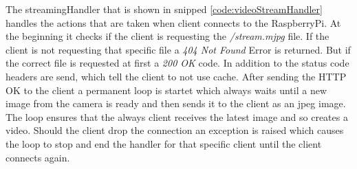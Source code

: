 

The streamingHandler that is shown in snipped \ref{code:videoStreamHandler} handles the actions that are taken when client connects to the RaspberryPi. At the beginning it checks if the client is requesting the \textit{/stream.mjpg} file. If the client is not requesting that specific file a \textit{404 Not Found} Error is returned. But if the correct file is requested at first a \textit{200 OK} code. In addition to the status code headers are send, which tell the client to not use cache. After sending the HTTP OK to the client a permanent loop is startet which always waits until a new image from the camera is ready and then sends it to the client as an jpeg image. The loop ensures that the always client receives the latest image and so creates a video. Should the client drop the connection an exception is raised which causes the loop to stop and end the handler for that specific client until the client connects again. \newline
